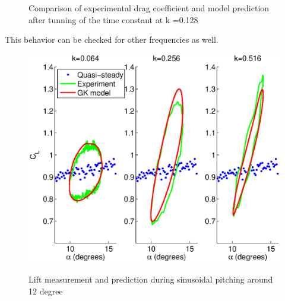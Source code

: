 \begin{figure}[h]
  \begin{center}
  \end{center}
  \caption{Comparison of experimental drag coefficient and model prediction after tunning of the time constant at k =0.128}
  \label{fig:Cd_u=3_meanaoa=12_amp=2_freq=0p5}
\end{figure}

\FloatBarrier

\par This behavior can be checked for other frequencies as well.

\begin{figure}[h]
  \begin{center}
    \scalebox{0.6}  
    {\includegraphics{./Figures/Pitching_allcases_GK_CL_12_amp_2.eps}}
  \end{center}
  \caption{Lift measurement and prediction during sinusoidal pitching around 12 degree} 
  \label{fig:Pitching_allcases_GK_Cl_12}
\end{figure}

